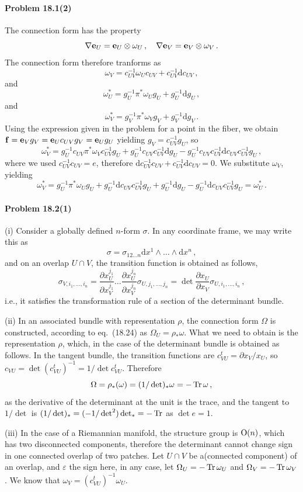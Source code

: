 \documentclass[a4paper,12pt]{article}
\def\d{\mathrm{d}}
\def\Tr{\ensuremath{\mathop{\rm Tr}}}
\newcommand{\problem}[1]{\paragraph{Problem #1}}
\begin{document}

\problem{18.1(2)} The connection form has the property
\[
 \nabla {\bf e}_U = {\bf e}_U \otimes \omega_U\,,\quad \nabla {\bf e}_V = {\bf e}_V \otimes \omega_V\,.
\]
The connection form therefore tranforms as
\[
 \omega_V = c_{UV}^{-1}\omega_U c_{UV} + c_{UV}^{-1}\d c_{UV}\,,
\]
and
\[
 \omega^*_U = g_U^{-1}\pi^* \omega_U g_U + g_U^{-1}\d g_U\,,
\]
and
\[
 \omega^*_V = g_V^{-1}\pi^* \omega_V g_V + g_V^{-1}\d g_V\,.
\]
Using the expression given in the problem for a point in the fiber, we obtain ${\bf f} = {\bf e}_V g_V = {\bf e}_U c_{UV} g_V = {\bf e}_U g_U$ yielding $g_V = c_{UV}^{-1}g_U$, so
\[
 \omega^*_V = g_U^{-1}c_{UV} \pi^* \omega_V c_{UV}^{-1} g_U + g_U^{-1}c_{UV} c_{UV}^{-1}\d g_U - g_U^{-1} c_{UV} c_{UV}^{-1} \d c_{UV} c_{UV}^{-1} g_U\,,
\]
where we used $c_{UV}^{-1}c_{UV}=e$, therefore $\d c_{UV}^{-1} c_{UV} + c_{UV}^{-1}\d c_{UV} = 0$.  We substitute $\omega_V$,  yielding
\[
 \omega_V^* =  g_U^{-1} \pi^* \omega_U g_U + g_U^{-1} \d c_{UV} c_{UV}^{-1}g_U + g_U^{-1}\d g_U - g_U^{-1} \d c_{UV} c_{UV}^{-1}g_U = \omega_U^*\,.
\]


\problem{18.2(1)} (i) Consider a globally defined $n$-form $\sigma$. In any coordinate frame, we may write this as
\[
 \sigma = \sigma_{12\dots n}\d x^1\wedge\dots\wedge\d x^n\,,
\]
and on an overlap $U\cap V$, the transition function is obtained as follows,
\[
 \sigma_{V,i_1,\dots, i_n} = \frac{\partial x_U^{j_1}}{\partial x_V^{j_1}}\dots \frac{\partial x_U^{j_n}}{\partial x_V^{j_n}}\sigma_{U,j_1,\dots,j_n} = \det \frac{\partial x_U}{\partial x_V}\sigma_{U,i_1,\dots,i_n}\,,
\]
i.e., it satisfies the transformation rule of a section of the determinant bundle.

(ii) In an associated bundle with representation $\rho$, the connection form $\Omega$ is constructed, according to eq.\ (18.24) as $\Omega_U = \rho_* \omega$. What we need to obtain is the representation $\rho$, which, in the case of the determinant bundle is obtained as follows. In the tangent bundle, the transition functions are $c^t_{VU} = \partial x_V/x_U$, so $c_{VU} = \det (c^t_{VU})^{-1} = 1/\det c^t_{VU}$. Therefore
\[
 \Omega = \rho_*(\omega) = (1/\det)_* \omega = -\Tr\omega\,,
\]
as the derivative of the determinant at the unit is the trace, and the tangent to $1/\det$ is $(1/\det)_* = (-1/\det^2)\det_* = -\Tr$ as $\det e=1$.

(iii) In the case of a Riemannian manifold, the structure group is ${\rm O}(n)$, which has two disconnected components, therefore the determinant cannot change sign in one connected overlap of two patches. Let $U\cap V$ be a(connected component) of an overlap, and $\varepsilon$ the sign here, in any case, let $\Omega_U = -\Tr \omega_U$ and $\Omega_V = -\Tr\omega_V$. We know that $\omega_V = (c_{VU}^t)^{-1} \omega_U$.
\end{document}

